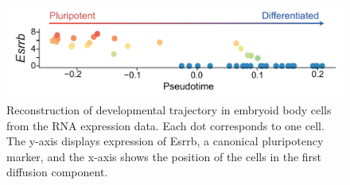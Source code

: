 \begin{figure}[H]
	\centering
	\includegraphics[width=0.9\linewidth]{scNMT_pseudotime}
	\caption[]{Reconstruction of developmental trajectory in embryoid body cells from the RNA expression data. Each dot corresponds to one cell. The y-axis displays expression of Esrrb, a canonical pluripotency marker, and the x-axis shows the position of the cells in the first diffusion component.}
	\label{fig:scnmt_pseudotime}
\end{figure}



